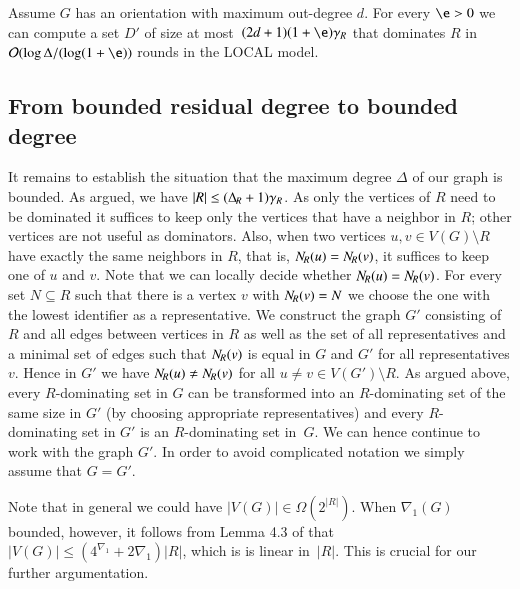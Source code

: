 \begin{corollary}\label{cor:LP-approx-general}
  Assume $G$ has an orientation with maximum out-degree
  $d$. For every $\e>0$ we can
  compute a set $D'$ of size at most~$(2d+1)(1+\e)\gamma_R$ that dominates
  $R$ in $\Oof(\log \Delta/(\log (1+\e))$ rounds in the LOCAL
  model.
\end{corollary}

\subsection{From bounded residual degree to bounded degree}

It remains to establish the situation that the maximum degree $\Delta$
of our graph is bounded. As argued, we have $|R|\leq (\Delta_{\hspace{-1pt}R}+1)\gamma_R$.
As only
the vertices of $R$ need to be
dominated it suffices to keep only the vertices that have a
neighbor in $R$; other vertices are not useful as dominators.
Also, when two vertices $u,v\in V(G)\setminus R$ have exactly
the same neighbors in $R$, that is, $N_{\hspace{-1pt}R}(u)=N_{\hspace{-1pt}R}(v)$,
it suffices to keep one of $u$ and $v$.
Note that we can locally decide whether $N_{\hspace{-1pt}R}(u)=N_{\hspace{-1pt}R}(v)$.
For every set $N\subseteq R$ such that there is a vertex $v$
with $N_{\hspace{-1pt}R}(v)=N$ we choose the one with the lowest identifier
as a representative. We construct the graph $G'$ consisting
of $R$ and all edges between vertices in $R$ as well as the
set of all representatives and a minimal set of edges such that
$N_{\hspace{-1pt}R}(v)$ is equal in $G$ and $G'$ for all representatives $v$.
Hence in $G'$ we have $N_{\hspace{-1pt}R}(u)\neq N_{\hspace{-1pt}R}(v)$ for all $u\neq v\in V(G')\setminus R$.
As argued above, every $R$-dominating set in $G$ can
be transformed into an $R$-dominating set of the same size
in $G'$ (by choosing appropriate representatives) and
every $R$-dominating set in $G'$ is an $R$-dominating set in~$G$.
We can hence continue to work with the graph $G'$. In order to
avoid complicated notation we simply assume that $G=G'$.

Note that in general we could have $|V(G)|\in \Omega(2^{|R|})$.
When $\nabla_1(G)$ bounded, however,  it follows from Lemma 4.3 of \cite{gajarsky2017kernelization} that $|V(G)|\leq (4^{\nabla_1}+2\nabla_1)|R|$,
which is is linear
in~$|R|$. This is crucial for our further argumentation.

%


